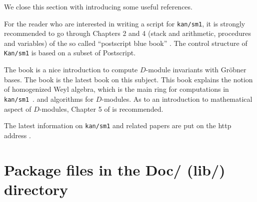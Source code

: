 \documentclass{article}
\def\kansm{ {\tt kan/sm1}\ }
\begin{document}
\medbreak

We close this section with introducing some useful references.

For the reader who are interested in writing a script for {\tt kan/sm1},
it is strongly recommended to go through Chapters 2 and 4
(stack and arithmetic, procedures and variables) of the so called
``postscript blue book'' \cite{Postscript}.
The control structure of {\tt Kan/sm1} is based on a subset of
Postscript.

The book \cite{Oaku} is a nice introduction to compute $D$-module invariants
with Gr\"obner bases. 
The book \cite{SST} is the latest book on this subject.
This book explains the notion of homogenized Weyl algebra,
which is the main ring for computations in \kansm.
and algorithms for $D$-modules.
As to an introduction to mathematical aspect of $D$-modules, 
Chapter 5 of \cite{Hotta} is recommended.

The latest information on {\tt kan/sm1} and related papers are put on the
http address \cite{www}.

\section{Package files in the Doc/ (lib/) directory}
\end{document}
